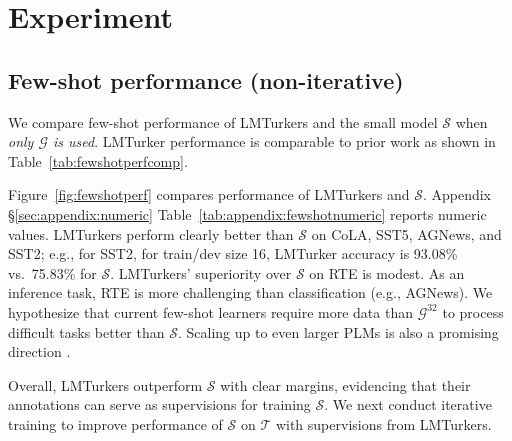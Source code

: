 \documentclass[11pt]{article}
\def\mdr{LMTurker\xspace}
\def\mdrs{LMTurkers\xspace}
\def\figref#1{Figure~\ref{fig:#1}}
\def\tabref#1{Table~\ref{tab:#1}}
\def\secref#1{\S\ref{sec:#1}}
\begin{document}
\section{Experiment}
\subsection{Few-shot performance (non-iterative)}
We compare few-shot performance
of \mdrs
and
the small model $\mathcal{S}$
when \emph{only $\mathcal{G}$ is used}.
\mdr performance
is comparable to prior work
\citep{PETpaper,schick2020s,gao-etal-2021-making}
as shown in \tabref{fewshotperfcomp}.


\figref{fewshotperf}
compares performance of \mdrs
and $\mathcal{S}$.
Appendix \secref{appendix:numeric}
\tabref{appendix:fewshotnumeric}
reports numeric values.
\mdrs perform clearly
better than $\mathcal{S}$
on CoLA, SST5, AGNews, and SST2; e.g.,
for SST2, for train/dev size 16,
\mdr
accuracy is 93.08\% vs.\ 75.83\% for
$\mathcal{S}$.
\mdrs' superiority
over $\mathcal{S}$  
on RTE is
modest.
As an inference task, RTE is more challenging than
classification (e.g., AGNews).
We hypothesize that current few-shot learners
require more data than $\mathcal{G}^{32}$ to
process difficult
tasks  better than
$\mathcal{S}$.  
Scaling up to even larger
PLMs is also a promising
direction \citep{GPT3paper,Prompttuningpaper}.


Overall,
\mdrs
outperform $\mathcal{S}$  
with clear margins,
evidencing that their annotations
can serve as supervisions for training
$\mathcal{S}$.
We next conduct iterative training
to improve performance of
$\mathcal{S}$ on $\mathcal{T}$
with supervisions from \mdrs.
\end{document}
